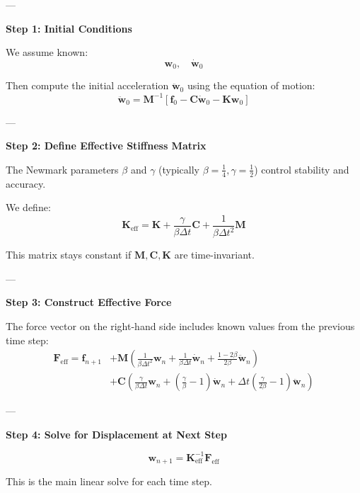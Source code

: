 \documentclass{article}
\begin{document}
	---
	
	\textbf{Step 1: Initial Conditions}
	
	We assume known:
	\[
	\mathbf{w}_0, \quad \dot{\mathbf{w}}_0
	\]
	
	Then compute the initial acceleration \( \ddot{\mathbf{w}}_0 \) using the equation of motion:
	\begin{equation}
		\ddot{\mathbf{w}}_0 = \mathbf{M}^{-1} \left[ \mathbf{f}_0 - \mathbf{C} \dot{\mathbf{w}}_0 - \mathbf{K} \mathbf{w}_0 \right]
	\end{equation}
	
	---
	
	\textbf{Step 2: Define Effective Stiffness Matrix}
	
	The Newmark parameters \( \beta \) and \( \gamma \) (typically \( \beta = \tfrac{1}{4}, \gamma = \tfrac{1}{2} \)) control stability and accuracy.
	
	We define:
	\begin{equation}
		\mathbf{K}_{\text{eff}} = \mathbf{K} + \frac{\gamma}{\beta \Delta t} \mathbf{C} + \frac{1}{\beta \Delta t^2} \mathbf{M}
	\end{equation}
	
	This matrix stays constant if \( \mathbf{M}, \mathbf{C}, \mathbf{K} \) are time-invariant.
	
	---
	
	\textbf{Step 3: Construct Effective Force}
	
	The force vector on the right-hand side includes known values from the previous time step:
	\begin{align}
		\mathbf{F}_{\text{eff}} = \mathbf{f}_{n+1} &+ \mathbf{M} \left( \frac{1}{\beta \Delta t^2} \mathbf{w}_n + \frac{1}{\beta \Delta t} \dot{\mathbf{w}}_n + \frac{1 - 2\beta}{2\beta} \ddot{\mathbf{w}}_n \right) \\
		&+ \mathbf{C} \left( \frac{\gamma}{\beta \Delta t} \mathbf{w}_n + \left( \frac{\gamma}{\beta} - 1 \right) \dot{\mathbf{w}}_n + \Delta t \left( \frac{\gamma}{2\beta} - 1 \right) \ddot{\mathbf{w}}_n \right)
	\end{align}
	
	---
	
	\textbf{Step 4: Solve for Displacement at Next Step}
	
	\begin{equation}
		\mathbf{w}_{n+1} = \mathbf{K}_{\text{eff}}^{-1} \mathbf{F}_{\text{eff}}
	\end{equation}
	
	This is the main linear solve for each time step.
	
\end{document}
